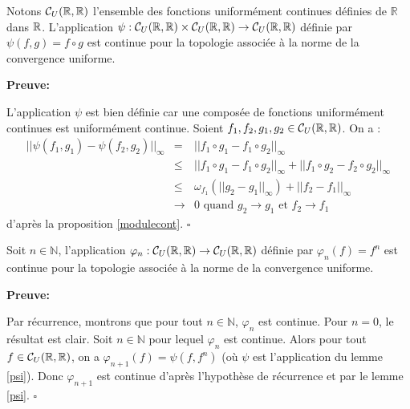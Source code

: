 \begin{lemma}\label{psi}
	Notons $\mathcal{C}_U(\mathbb{R},\mathbb{R})$ l'ensemble des fonctions uniformément continues définies de $\mathbb{R}$ dans ${\mathbb{R}}$. L'application $\psi: \mathcal{C}_U(\mathbb{R},\mathbb{R}) \times \mathcal{C}_U(\mathbb{R},\mathbb{R}) \to \mathcal{C}_U(\mathbb{R},\mathbb{R})$ définie par $\psi(f,g)=f\circ g$ est continue pour la topologie associée à la norme de la convergence uniforme.
\end{lemma}

	\textbf{Preuve:}
	\par L'application $\psi$ est bien définie car une composée de fonctions uniformément continues est uniformément continue. Soient $f_1, f_2, g_1, g_2 \in \mathcal{C}_U(\mathbb{R},\mathbb{R})$. On a :
	\begin{eqnarray*}
	||\psi(f_1,g_1) -\psi(f_2,g_2)||_{\infty}&=& ||f_1\circ g_1 - f_1 \circ g_2||_{\infty}\\
		&\leq& ||f_1\circ g_1 - f_1\circ g_2||_{\infty} +||f_1\circ g_2	- f_2 \circ g_2||_{\infty} \\
		&\leq& \omega_{f_1}(||g_2 - g_1||_{\infty}) + ||f_2 - f_1||_{\infty} \\
		&\longrightarrow& 0 \text{ quand } g_2 \to g_1 \text{ et } f_2 \to f_1
	\end{eqnarray*}
d'après la proposition \ref{modulecont}. $\square$\\






\begin{corollary}\label{phin}
	Soit $n \in \mathbb{N}$, l'application  $\varphi_n : \mathcal{C}_U(\mathbb{R},\mathbb{R}) \to \mathcal{C}_U(\mathbb{R},\mathbb{R})$ définie par $\varphi_n(f)=f^n$ est continue pour la topologie associée à la norme de la convergence uniforme.
\end{corollary}

	\textbf{Preuve:}
		\par Par récurrence, montrons que pour tout $n \in \mathbb{N}$, $\varphi_n $ est continue. Pour $n=0$, le résultat est clair. Soit $n \in \mathbb{N}$ pour lequel $\varphi_n$ est continue. Alors pour tout $f \in  \mathcal{C}_U(\mathbb{R},\mathbb{R})$, on a $\varphi_{n+1}(f)= \psi(f,f^n)$ (où $\psi$ est l'application du lemme \ref{psi}). Donc $\varphi_{n+1}$ est continue d'après l'hypothèse de récurrence et par le lemme \ref{psi}. \hfill $\square$ \\






